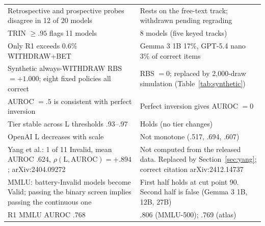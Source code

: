 \documentclass[11pt,a4paper]{article}
\begin{document}
\begin{center}
\begin{tabular}{p{6.6cm} p{7.8cm}}
Retrospective and prospective probes disagree in 12 of 20 models & Rests on the free-text track; withdrawn pending regrading \\
TRIN $\geq .95$ flags 11 models & 8 models (five keyed tracks) \\
Only R1 exceeds 0.6\% WITHDRAW+BET & Gemma 3 1B 17\%, GPT-5.4 nano 3\% of correct items \\
Synthetic always-WITHDRAW RBS $= +1.000$; eight fixed policies all correct & RBS $= 0$; replaced by 2,000-draw simulation (Table~\ref{tab:synthetic}) \\
AUROC $= .5$ is consistent with perfect inversion & Perfect inversion gives AUROC $= 0$ \\
Tier stable across L thresholds .93--.97 & Holds (no tier changes) \\
OpenAI L decreases with scale & Not monotone (.517, .694, .607) \\
Yang et al.: 1 of 11 Invalid, mean AUROC .624, $\rho(\text{L},\text{AUROC}) = +.894$; arXiv:2404.09272 & Not computed from the released data. Replaced by Section~\ref{sec:yang}; correct citation arXiv:2412.14737 \\
MMLU: battery-Invalid models become Valid; passing the binary screen implies passing the continuous one & First half holds at cut point 90. Second half is false (Gemma 3 1B, 12B, 27B) \\
R1 MMLU AUROC .768 & .806 (MMLU-500); .769 (atlas) \\
\bottomrule
\end{tabular}
\end{center}
\end{document}
